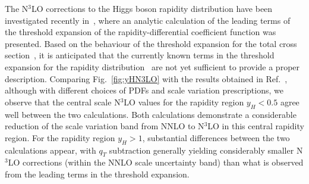 \documentclass[12pt]{article}
\DeclareRobustCommand{\qt}{q_T}
\begin{document}
The N$^3$LO corrections to the Higgs boson rapidity distribution have been investigated recently in~\cite{Dulat:2017prg},
where an analytic calculation of the leading terms of the threshold expansion of the  rapidity-differential coefficient function 
was presented. Based on the behaviour of the threshold expansion for the total cross section~\cite{Anastasiou:2015ema}, 
it is anticipated that the currently known terms in the threshold expansion
 for the rapidity distribution~\cite{Dulat:2017prg} are not yet sufficient to provide a proper description.  
Comparing Fig.~\ref{fig:yHN3LO} with the results obtained in Ref.~\cite{Dulat:2017prg}, although with different choices of PDFs and scale variation prescriptions, we observe that the central scale N$^3$LO values for the rapidity region $y_H < 0.5$ agree well between the two calculations. Both calculations demonstrate a considerable reduction of the scale variation band from NNLO to N$^3$LO in this central rapidity region. For the rapidity region $y_H > 1$, substantial differences 
between the two calculations appear, with $\qt$ subtraction generally yielding considerably smaller N$^3$LO corrections 
(within the NNLO scale uncertainty band) than what is observed from the leading terms in the threshold expansion.  


\end{document}
